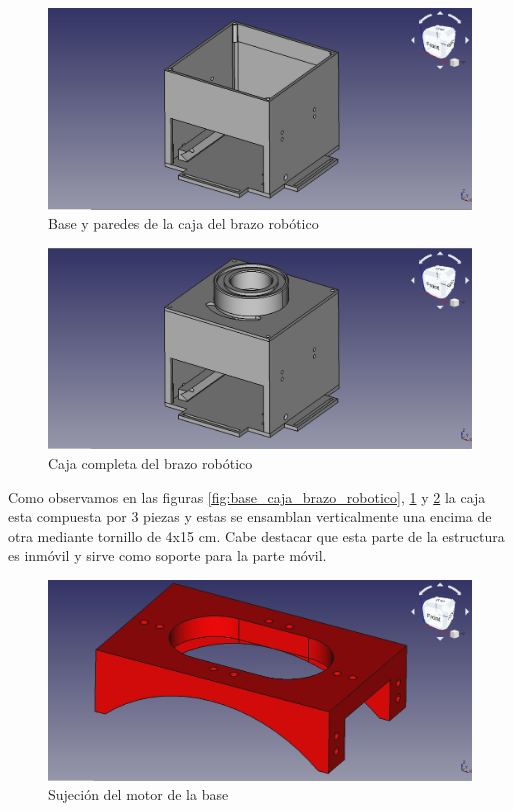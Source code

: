 \begin{figure}[H]
    \centering 
    \includegraphics[width=1\linewidth]{pictures/BaseYParedes.png}
    \caption{Base y paredes de la caja del brazo robótico}
    \label{fig:base_paredes_caja_brazo_robotico}
\end{figure}

\begin{figure}[H]
    \centering 
    \includegraphics[width=1\linewidth]{pictures/CajaCompleta.png}
    \caption{Caja completa del brazo robótico}
    \label{fig:caja_completa_brazo_robotico}
\end{figure}

Como observamos en las figuras \ref{fig:base_caja_brazo_robotico}, \ref{fig:base_paredes_caja_brazo_robotico} y \ref{fig:caja_completa_brazo_robotico} la caja esta compuesta por 3 piezas y estas se ensamblan verticalmente una encima de otra mediante tornillo de 4x15 cm.
Cabe destacar que esta parte de la estructura es inmóvil y sirve como soporte para la parte móvil.

\begin{figure}[H]
    \centering 
    \includegraphics[width=1\linewidth]{pictures/MotorHold.png}
    \caption{Sujeción del motor de la base}
    \label{fig:sujección_motor_base}
\end{figure}

